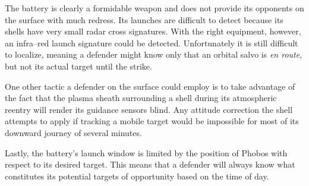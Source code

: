 The battery is clearly a formidable weapon and does not provide its opponents on the surface with much redress. Its launches are difficult to detect because its shells have very small radar cross signatures. With the right equipment, however, an infra--red launch signature could be detected. Unfortunately it is still difficult to localize, meaning a defender might know only that an orbital salvo is {\it en route}, but not its actual target until the strike. 

One other tactic a defender on the surface could employ is to take advantage of the fact that the plasma sheath surrounding a shell during its atmospheric reentry will render its guidance sensors blind. Any attitude correction the shell attempts to apply if tracking a mobile target would be impossible for most of its downward journey of several minutes.

Lastly, the battery's launch window is limited by the position of Phobos with respect to its desired target. This means that a defender will always know what constitutes its potential targets of opportunity based on the time of day.

